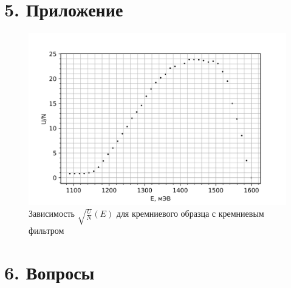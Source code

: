 \documentclass[a4paper,12pt]{report}
\begin{document}
\section*{5. Приложение}

    \begin{figure}[H]
        \centering
        \includegraphics[width=0.6\linewidth]{Si+GaAs.png}
        \caption{Зависимость $\sqrt{\frac{U}{N}}(E)$ для кремниевого образца с кремниевым фильтром}
    \end{figure}

\newpage
\section*{6. Вопросы}
\end{document}
